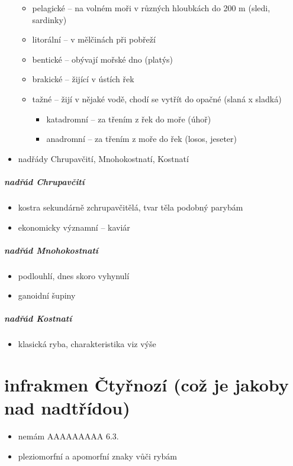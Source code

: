 \documentclass{article}
\begin{document}
\begin{itemize}
  \begin{itemize}
    \item pelagické -- na volném moři v různých hloubkách do 200 m (sledi, sardinky)
    \item litorální -- v mělčinách při pobřeží
    \item bentické -- obývají mořské dno (platýs)
    \item brakické -- žijící v ústích řek
    \item tažné -- žijí v nějaké vodě, chodí se vytřít do opačné (slaná x sladká)
    \begin{itemize}
      \item katadromní -- za třením z řek do moře (úhoř)
      \item anadromní -- za třením z moře do řek (losos, jeseter)
    \end{itemize}
  \end{itemize}
  \item nadřády Chrupavčití, Mnohokostnatí, Kostnatí
\end{itemize}

\subsubsection{nadřád Chrupavčití}
\begin{itemize}
  \item kostra sekundárně zchrupavčitělá, tvar těla podobný parybám
  \item ekonomicky významní -- kaviár
\end{itemize}

\subsubsection{nadřád Mnohokostnatí}
\begin{itemize}
  \item podlouhlí, dnes skoro vyhynulí
  \item ganoidní šupiny
\end{itemize}

\subsubsection{nadřád Kostnatí}
\begin{itemize}
  \item klasická ryba, charakteristika viz výše
\end{itemize}

\part{infrakmen Čtyřnozí (což je jakoby nad nadtřídou)}%
\begin{itemize}
  \item nemám AAAAAAAAA 6.3.
  \item pleziomorfní a apomorfní znaky vůči rybám
\end{itemize}
\end{document}
